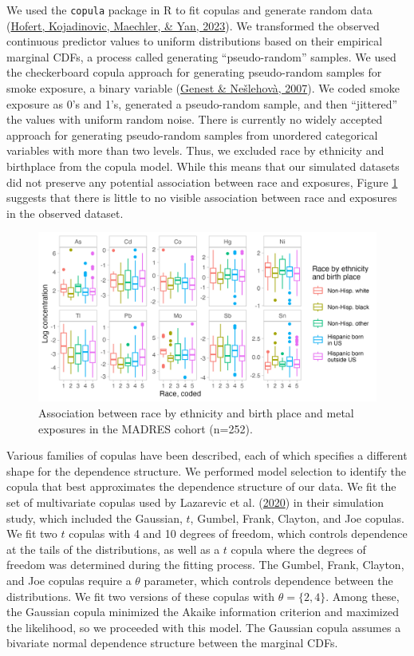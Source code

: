 \documentclass[12pt, twoside]{amherstthesis}
\begin{document}
We used the \texttt{copula} package in R to fit copulas and generate random data (\protect\hyperlink{ref-hofert_copula_2023}{Hofert, Kojadinovic, Maechler, \& Yan, 2023}). We transformed the observed continuous predictor values to uniform distributions based on their empirical marginal CDFs, a process called generating ``pseudo-random'' samples. We used the checkerboard copula approach for generating pseudo-random samples for smoke exposure, a binary variable (\protect\hyperlink{ref-genest_primer_2007}{Genest \& Nešlehovà, 2007}). We coded smoke exposure as 0's and 1's, generated a pseudo-random sample, and then ``jittered'' the values with uniform random noise. There is currently no widely accepted approach for generating pseudo-random samples from unordered categorical variables with more than two levels. Thus, we excluded race by ethnicity and birthplace from the copula model. While this means that our simulated datasets did not preserve any potential association between race and exposures, Figure \ref{fig:raceexp} suggests that there is little to no visible association between race and exposures in the observed dataset.
\begin{figure}

{\centering \includegraphics[width=0.8\linewidth]{figures/ch4_race_exp} 

}

\caption{Association between race by ethnicity and birth place and metal exposures in the MADRES cohort (n=252).}\label{fig:raceexp}
\end{figure}
Various families of copulas have been described, each of which specifies a different shape for the dependence structure. We performed model selection to identify the copula that best approximates the dependence structure of our data. We fit the set of multivariate copulas used by Lazarevic et al. (\protect\hyperlink{ref-lazarevic_performance_2020}{2020}) in their simulation study, which included the Gaussian, \(t\), Gumbel, Frank, Clayton, and Joe copulas. We fit two \(t\) copulas with 4 and 10 degrees of freedom, which controls dependence at the tails of the distributions, as well as a \(t\) copula where the degrees of freedom was determined during the fitting process. The Gumbel, Frank, Clayton, and Joe copulas require a \(\theta\) parameter, which controls dependence between the distributions. We fit two versions of these copulas with \(\theta=\{2, 4\}\). Among these, the Gaussian copula minimized the Akaike information criterion and maximized the likelihood, so we proceeded with this model. The Gaussian copula assumes a bivariate normal dependence structure between the marginal CDFs.
\end{document}
